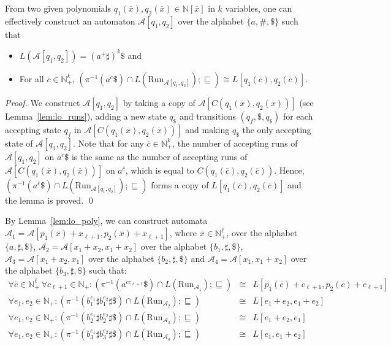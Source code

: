 \documentclass[envcountsame]{llncs}
\newcommand{\A}{\mathcal A}
\newcommand{\N}{\mathbb N}
\newcommand{\Run}{\mathrm{Run}}
\begin{document}
\begin{lemma}\label{lem:lo_poly}
{}From two given polynomials $q_1(\overline{x}),q_2(\overline{x})\in
\N[\overline{x}]$ in $k$ variables, one can effectively construct 
an automaton $\A[q_1,q_2]$ over the alphabet $\{a,\#,\$\}$ such that
\begin{itemize}
\item $L(\A[q_1,q_2]) = (a^+\sharp)^k \$$ and
\item For all $\overline{c}\in \N_+^k$,  
 $(\pi^{-1}(a^{\overline{c}}\$) \cap L(\Run_{\A[q_1,q_2]}); \sqsubseteq) \cong L[q_1(\overline{c}), q_2(\overline{c})]$.
\end{itemize}
\end{lemma}
\begin{proof}
We construct $\A[q_1,q_2]$ by taking a copy of
$\A[C(q_1(\overline{x}),q_2(\overline{x}))]$ (see Lemma~\ref{lem:lo_runs}), 
adding a new state $q_{\$}$ and transitions $(q_f, \$, q_{\$})$ for each accepting state 
$q_f$ in $\A[C(q_1(\overline{x}),q_2(\overline{x}))]$ and making $q_{\$}$ the only accepting state of $\A[q_1,q_2]$.
Note that for any $\overline{c}\in \N_+^k$, the number of accepting runs of $\A[q_1,q_2]$ 
on $a^{\overline{c}}\$$ is the same as the number of accepting 
runs of $\A[C(q_1(\overline{x}),q_2(\overline{x}))]$ on $a^{\overline{c}}$, which is equal to $C(q_1(\overline{c}), q_2(\overline{c}))$.
Hence, $(\pi^{-1}(a^{\overline{c}}\$) \cap L(\Run_{\A[q_1,q_2]}); \sqsubseteq)$ 
forms a copy of $L[q_1(\overline{c}), q_2(\overline{c})]$ and the lemma is proved.
\qed
\end{proof}
By Lemma~\ref{lem:lo_poly}, we can construct automata
$\A_1=\A[p_1(\overline{x})+x_{\ell+1}, p_2(\overline{x})+x_{\ell+1}]$,
where $\overline{x}\in \N_+^\ell$, over the alphabet
$\{a,\sharp,\$\}$, $\A_2=\A[x_1+x_2,x_1+x_2]$ over the alphabet $\{b_1,
\sharp, \$\}$, $\A_3=\A[x_1+x_2,x_1]$ over the alphabet $\{b_2,\sharp, \$\}$
and $\A_4=\A[x_1,x_1+x_2]$ over the alphabet $\{b_3,\sharp, \$\}$ such that:
\begin{eqnarray}
\forall \overline{c}\in \N_+^\ell \ \forall c_{\ell+1}\in \N_+ :
(\pi^{-1}(a^{\overline{c}c_{\ell+1}}\$) \cap L(\Run_{\A_1});\sqsubseteq)
 & \cong & L[p_1(\overline{c})+c_{\ell+1}, p_2(\overline{c})+c_{\ell+1}] \label{eq-A1} \\
\forall e_1,e_2\in \N_+ :
  (\pi^{-1}(b_1^{e_1}\sharp b_1^{e_2}\sharp\$) \cap L(\Run_{\A_2});
  \sqsubseteq) & \cong & L[e_1+e_2,e_1+e_2] \label{eq-A2} \\
\forall e_1,e_2\in \N_+ : 
 (\pi^{-1}(b_2^{e_1}\sharp b_2^{e_2}\sharp\$) \cap L(\Run_{\A_3});
 \sqsubseteq) & \cong & L[e_1+e_2,e_1]  \label{eq-A3} \\
\forall e_1,e_2\in \N_+ :
(\pi^{-1}(b_3^{e_1}\sharp b_3^{e_2}\sharp\$) \cap L(\Run_{\A_4}); \sqsubseteq)
 & \cong & L[e_1,e_1+e_2]   \label{eq-A4}
\end{eqnarray}
\end{document}

